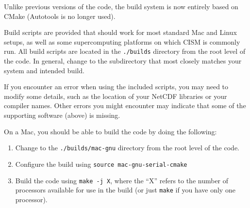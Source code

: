 Unlike previous versions of the code, the build system is now entirely based on CMake 
(Autotools is no longer used). 

Build scripts are provided that should work for most standard Mac and Linux setups, 
as well as some supercomputing platforms on which CISM is commonly run.
All build scripts are located in the \texttt{./builds} directory from the root level of the code.
In general, change to the subdirectory that most closely matches your system and intended
build.

If you encounter an error when using the included scripts, you may need to modify some details, 
such as the location of your NetCDF libraries or your compiler names.  Other errors you might 
encounter may indicate that some of the supporting software (above) is missing.


\begin{mdframed}[style=mac] %
On a Mac, you should be able to build the code by doing the following:

\begin{enumerate}
\item{Change to the \texttt{./builds/mac-gnu} directory from the root level of the code.}
\item{Configure the build using \texttt{source mac-gnu-serial-cmake}}
\item{Build the code using \texttt{make -j X}, where the ``X'' refers to the number of processors available for use in the build (or just \texttt{make} if you have only one processor).}
\end{enumerate}
\end{mdframed}              %


